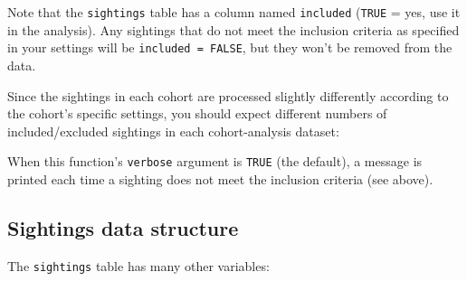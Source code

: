 \documentclass[
]{book}
\newenvironment{Shaded}{\begin{snugshade}}{\end{snugshade}}
\newcommand{\DecValTok}[1]{\textcolor[rgb]{0.00,0.00,0.81}{#1}}
\newcommand{\NormalTok}[1]{#1}
\newcommand{\OperatorTok}[1]{\textcolor[rgb]{0.81,0.36,0.00}{\textbf{#1}}}
\newcommand{\OtherTok}[1]{\textcolor[rgb]{0.56,0.35,0.01}{#1}}
\newcommand{\StringTok}[1]{\textcolor[rgb]{0.31,0.60,0.02}{#1}}
\begin{document}
Note that the \texttt{sightings} table has a column named \texttt{included} (\texttt{TRUE} = yes, use it in the analysis). Any sightings that do not meet the inclusion criteria as specified in your settings will be \texttt{included\ =\ FALSE}, but they won't be removed from the data.

Since the sightings in each cohort are processed slightly differently according to the cohort's specific settings, you should expect different numbers of included/excluded sightings in each cohort-analysis dataset:

\begin{Shaded}
\end{Shaded}

When this function's \texttt{verbose} argument is \texttt{TRUE} (the default), a message is printed each time a sighting does not meet the inclusion criteria (see above).

\hypertarget{sightings-data-structure}{%
\subsection*{Sightings data structure}\label{sightings-data-structure}}

The \texttt{sightings} table has many other variables:
\end{document}
